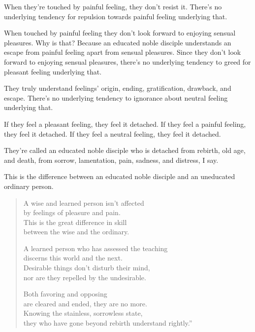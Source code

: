 \documentclass[12pt,openany]{book}%
\begin{document}
When they’re touched by painful feeling, they don’t resist it. There’s no underlying tendency for repulsion towards painful feeling underlying that. 

When touched by painful feeling they don’t look forward to enjoying sensual pleasures. Why is that? Because an educated noble disciple understands an escape from painful feeling apart from sensual pleasures. Since they don’t look forward to enjoying sensual pleasures, there’s no underlying tendency to greed for pleasant feeling underlying that. 

They truly understand feelings’ origin, ending, gratification, drawback, and escape. There’s no underlying tendency to ignorance about neutral feeling underlying that. 

If they feel a pleasant feeling, they feel it detached. If they feel a painful feeling, they feel it detached. If they feel a neutral feeling, they feel it detached. 

They’re called an educated noble disciple who is detached from rebirth, old age, and death, from sorrow, lamentation, pain, sadness, and distress, I say. 

This is the difference between an educated noble disciple and an uneducated ordinary person. 

\begin{verse}%
A wise and learned person isn’t affected \\
by feelings of pleasure and pain. \\
This is the great difference in skill \\
between the wise and the ordinary. 

A learned person who has assessed the teaching \\
discerns this world and the next. \\
Desirable things don’t disturb their mind, \\
nor are they repelled by the undesirable. 

Both favoring and opposing \\
are cleared and ended, they are no more. \\
Knowing the stainless, sorrowless state, \\
they who have gone beyond rebirth understand rightly.” 

%
\end{verse}
\end{document}
